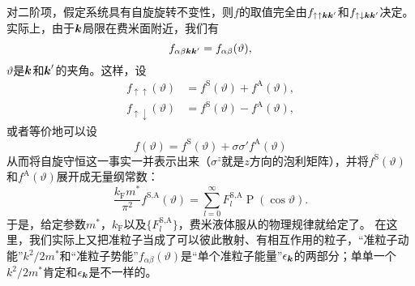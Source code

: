 \documentclass[hyperref, UTF8, a4paper]{ctexart}
\DeclareMathOperator{\legpoly}{P}
\begin{document}
对二阶项，假定系统具有自旋旋转不变性，则$f$的取值完全由$f_{\uparrow \uparrow \vb*{k} \vb*{k}'}$和$f_{\uparrow \downarrow \vb*{k} \vb*{k}'}$决定。
实际上，由于$\vb*{k}$局限在费米面附近，我们有
\[
    f_{\alpha \beta \vb*{k} \vb*{k}'} = f_{\alpha \beta}(\vartheta),
\]
$\vartheta$是$\vb*{k}$和$\vb*{k}'$的夹角。这样，设
\begin{equation}
    \begin{aligned}
        f_{\uparrow \uparrow}(\vartheta) &= f^\text{S}(\vartheta) + f^\text{A}(\vartheta), \\
        f_{\uparrow \downarrow}(\vartheta) &= f^\text{S}(\vartheta) - f^\text{A}(\vartheta),
    \end{aligned}
\end{equation}
或者等价地可以设
\begin{equation}
    {f}(\vartheta) = f^\text{S}(\vartheta) + {\sigma} {\sigma}' f^\text{A}(\vartheta)
\end{equation}
从而将自旋守恒这一事实一并表示出来（${\sigma}^z$就是$z$方向的泡利矩阵），并将$f^\text{S}(\vartheta)$和$f^\text{A}(\vartheta)$展开成无量纲常数：
\begin{equation}
    \frac{k_\text{F} m^*}{\pi^2} f^\text{S,A}(\vartheta) = \sum_{l=0}^\infty F_l^\text{S,A} \legpoly (\cos \vartheta).
\end{equation}
于是，给定参数$m^*$，$k_\text{F}$以及$\{F_l^\text{S,A}\}$，费米液体服从的物理规律就给定了。
在这里，我们实际上又把准粒子当成了可以彼此散射、有相互作用的粒子，“准粒子动能”$k^2/2m^*$和“准粒子势能”$f_{\alpha \beta}(\vartheta)$是“单个准粒子能量”$\epsilon_{\vb*{k}}$的两部分；单单一个$k^2/2m^*$肯定和$\epsilon_{\vb*{k}}$是不一样的。
\end{document}
